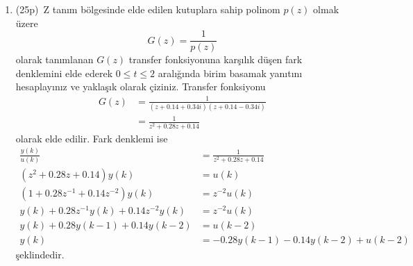 \begin{enumerate}[\bfseries S1.]
\begin{enumerate}
        \item(25p)\, Z tanım bölgesinde elde edilen kutuplara sahip polinom $p(z)$ olmak üzere
        \begin{equation}
            G(z)=\frac{1}{p(z)}
        \end{equation}
        olarak tanımlanan $G(z)$ transfer fonksiyonuna karşılık düşen fark denklemini elde ederek $0\leq t\leq 2$ aralığında birim basamak yanıtını hesaplayınız ve yaklaşık olarak çiziniz. 
        Transfer fonksiyonu
        \begin{equation}
        \begin{split}
            G(z)&=\frac{1}{(z+0.14+0.34i)(z+0.14-0.34i)}\\
            &=\frac{1}{z^2+0.28z+0.14}
        \end{split}
        \end{equation}
        olarak elde edilir. Fark denklemi ise 
        \begin{equation}
            \begin{split}
                \frac{y(k)}{u(k)}&=\frac{1}{z^2+0.28z+0.14}\\
                (z^2+0.28z+0.14)y(k)&=u(k)\\
                (1+0.28z^{-1}+0.14z^{-2})y(k)&=z^{-2}u(k)\\
                y(k)+0.28z^{-1}y(k)+0.14z^{-2}y(k)&=z^{-2}u(k)\\
                y(k)+0.28y(k-1)+0.14y(k-2)&=u(k-2)\\
                y(k)&=-0.28y(k-1)-0.14y(k-2)+u(k-2)
            \end{split}
        \end{equation}
        şeklindedir.

        \begin{center}
        \end{center}
    \end{enumerate}
    

\end{enumerate}

